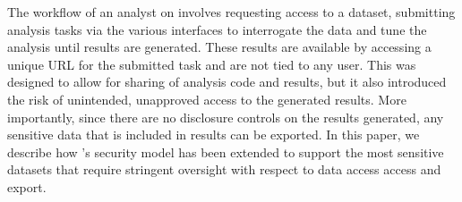 The workflow of an analyst on \NAME involves requesting access to a dataset, submitting analysis
tasks via the various interfaces \cite{babuji2017enabling} to interrogate the data and tune the analysis until results are generated.
These results are available by accessing a unique URL for the submitted task and are not tied to any user.
This was designed to allow for sharing of analysis code and results, but it also introduced the risk
of unintended, unapproved access to the generated results. More importantly, since there are no disclosure
controls on the results generated, any sensitive data that is included in results can be exported.
In this paper, we describe how \NAMENS's security model has been extended to support the most sensitive datasets
that require stringent oversight with respect to data access access and export.



